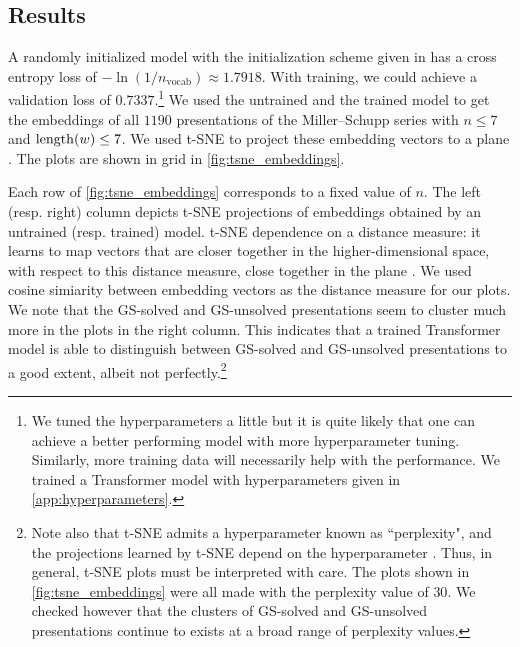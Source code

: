 \subsection{Results}\label{sec:transformer_results}

A randomly initialized model with the initialization scheme given in \cite{Radford2019LanguageMA} has a cross entropy loss of
$-\ln (1/n_{\text{vocab}}) \approx 1.7918$.
With training, we could achieve a validation loss of $0.7337$.\footnote{
We tuned the hyperparameters a little but it is quite likely that one can achieve a better performing model with more hyperparameter tuning.
Similarly, more training data will necessarily help with the performance.
We trained a Transformer model with hyperparameters given in \cref{app:hyperparameters}.}
We used the untrained and the trained model to get the embeddings of all $1190$ presentations of the Miller--Schupp series with $n \leq 7$ and $\operatorname{length}(w) \leq 7$.
We used t-SNE to project these embedding vectors to a plane \cite{JMLR:v9:vandermaaten08a}.
The plots are shown in grid in \cref{fig:tsne_embeddings}.

Each row of \cref{fig:tsne_embeddings} corresponds to a fixed value of $n$.
The left (resp. right) column depicts t-SNE projections of embeddings obtained by an untrained (resp. trained) model.
t-SNE dependence on a distance measure: it learns to map vectors that are closer together in the higher-dimensional space, with respect to this distance measure, close together in the plane \cite{JMLR:v9:vandermaaten08a}.
We used cosine simiarity between embedding vectors as the distance measure for our plots.
We note that the GS-solved and GS-unsolved presentations seem to cluster much more in the plots in the right column.
This indicates that a trained Transformer model is able to distinguish between GS-solved and GS-unsolved presentations to a good extent, albeit not perfectly.\footnote{
Note also that t-SNE admits a hyperparameter known as ``perplexity", and the projections learned by t-SNE depend on the hyperparameter \cite{wattenberg2016how}.
Thus, in general, t-SNE plots must be interpreted with care.
The plots shown in \cref{fig:tsne_embeddings} were all made with the perplexity value of $30$.
We checked however that the clusters of GS-solved and GS-unsolved presentations continue to exists at a broad range of perplexity values.}

